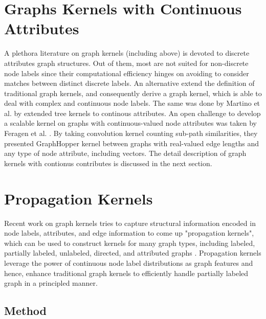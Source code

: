 \section{Graphs Kernels with Continuous Attributes}
A plethora literature on graph kernels (including above) is devoted to discrete attributes graph structures. Out of them, most are not suited for non-discrete node labels since their computational efficiency
hinges on avoiding to consider matches between distinct
discrete labels. An alternative extend the definition of traditional graph kernels, and consequently derive a graph kernel, which is able to deal with complex and continuous node labels. The same was done by Martino et al. \citep{Martino2012} by extended tree kernels to continous attributes. An open challenge to develop a scalable kernel on graphs with continuous-valued node attributes was taken by Feragen et al. \citep{Feragen2013}. By taking convolution kernel counting sub-path similarities, they presented  GraphHopper kernel between graphs with real-valued edge lengths and any type of node attribute, including vectors. The detail description of graph kernels with contionus contributes is discussed in the next section.

\section{Propagation Kernels}
\label{sec:PGK}

Recent work on graph kernels tries to capture structural information encoded in node labels, attributes, and edge information to come up "propagation kernels", which can be used to construct kernels for many graph types, including labeled, partially labeled, unlabeled, directed, and attributed graphs \citep{Neumann2015}. Propagation kernels leverage the power of continuous node label distributions as graph features
and hence, enhance traditional graph kernels to efficiently handle partially labeled graph in a principled manner.

\subsection{Method}


